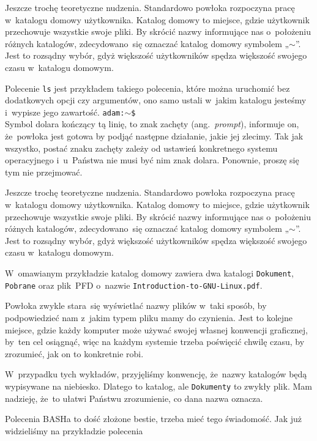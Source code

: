 \documentclass[10pt,t]{beamer}
\begin{document}
\begin{frame}
  Jeszcze trochę teoretyczne nudzenia. Standardowo powłoka rozpoczyna pracę
  w~katalogu domowy użytkownika. Katalog domowy to miejsce, gdzie użytkownik
  przechowuje wszystkie swoje pliki. By skrócić nazwy informujące nas
  o~położeniu różnych katalogów, zdecydowano~się oznaczać katalog domowy
  symbolem „$\sim$”. Jest to rozsądny wybór, gdyż większość użytkowników
  spędza większość swojego czasu w~katalogu domowym.

  Polecenie \texttt{ls} jest przykładem takiego polecenia, które można
  uruchomić bez dodatkowych opcji czy argumentów, ono samo ustali w~jakim
  katalogu jesteśmy i~wypisze jego zawartość.
  \texttt{adam:$\sim$\$} \\
  Symbol dolara kończący tą linię, to znak zachęty (ang.~\textit{prompt}),
  informuje on, że~powłoka jest gotowa by podjąć następne działanie, jakie
  jej zlecimy. Tak jak wszystko, postać znaku zachęty zależy od ustawień
  konkretnego systemu operacyjnego i~u~Państwa nie musi być nim znak dolara.
  Ponownie, proszę się tym nie przejmować.

  Jeszcze trochę teoretyczne nudzenia. Standardowo powłoka rozpoczyna pracę
  w~katalogu domowy użytkownika. Katalog domowy to miejsce, gdzie użytkownik
  przechowuje wszystkie swoje pliki. By skrócić nazwy informujące nas
  o~położeniu różnych katalogów, zdecydowano~się oznaczać katalog domowy
  symbolem „$\sim$”. Jest to rozsądny wybór, gdyż większość użytkowników
  spędza większość swojego czasu w~katalogu domowym.



  W~omawianym przykładzie katalog domowy zawiera dwa katalogi
  \texttt{Dokument}, \texttt{Pobrane} oraz plik~PFD o~nazwie
  \texttt{Introduction-to-GNU-Linux.pdf}.

  Powłoka zwykle stara~się wyświetlać nazwy plików w~taki sposób, by
  podpowiedzieć nam z~jakim typem pliku mamy do czynienia. Jest to kolejne
  miejsce, gdzie każdy komputer może używać swojej własnej konwencji
  graficznej, by~ten cel osiągnąć, więc na każdym systemie trzeba poświęcić
  chwilę czasu, by zrozumieć, jak on to konkretnie robi.

  W~przypadku tych wykładów, przyjęliśmy konwencję, że~nazwy katalogów
  będą wypisywane na niebiesko. Dlatego \texttt{}
  to katalog, ale \texttt{Dokumenty} to zwykły plik. Mam nadzieję, że~to
  ułatwi Państwu zrozumienie, co dana nazwa oznacza.

    Polecenia BASHa to dość złożone bestie, trzeba mieć tego świadomość.
  Jak już widzieliśmy na przykładzie polecenia


\end{frame}
\end{document}
